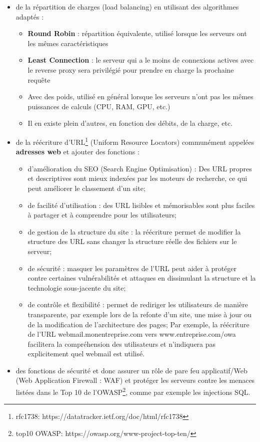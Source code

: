\begin{itemize}
    \item de la répartition de charges (load balancing) en utilisant des algorithmes adaptés :
        \begin{itemize}
            \item \textbf{Round Robin} : répartition équivalente, utilisé lorsque les serveurs ont les mêmes caractéristiques
            \item \textbf{Least Connection} : le serveur qui a le moins de connexions actives avec le reverse proxy sera privilégié pour prendre en charge la prochaine requête
            \item Avec des poids, utilisé en général lorsque les serveurs n'ont pas les mêmes puissances de calculs (CPU, RAM, GPU, etc.)
            \item Il en existe plein d'autres, en fonction des débits, de la charge, etc.
        \end{itemize}
    \item de la réécriture d'URL\footnote{rfc1738: https://datatracker.ietf.org/doc/html/rfc1738} (Uniform Resource Locators) communément appelées \textbf{adresses web} et ajouter des fonctions :
        \begin{itemize}
            \item d'amélioration du SEO (Search Engine Optimisation) : Des URL propres et descriptives sont mieux indexées par les moteurs de recherche, ce qui peut améliorer le classement d'un site;
            \item de facilité d'utilisation : des URL lisibles et mémorisables sont plus faciles à partager et à comprendre pour les utilisateurs;
            \item de gestion de la structure du site : la réécriture permet de modifier la structure des URL sans changer la structure réelle des fichiers sur le serveur;
            \item de sécurité : masquer les paramètres de l'URL peut aider à protéger contre certaines vulnérabilités et attaques en dissimulant la structure et la technologie sous-jacente du site;
            \item de contrôle et flexibilité : permet de rediriger les utilisateurs de manière transparente, par exemple lors de la refonte d'un site, une mise à jour ou de la modification de l'architecture des pages;
            Par exemple, la réécriture de l'URL webmail.monentreprise.com vers www.entreprise.com/owa facilitera la compréhension des utilisateurs et n'indiquera pas explicitement quel webmail est utilisé.
        \end{itemize}
    \item des fonctions de sécurité et donc assurer un rôle de pare feu applicatif/Web (Web Application Firewall : WAF) et protéger les serveurs contre les menaces listées dans le Top 10 de l’OWASP\footnote{top10 OWASP: https://owasp.org/www-project-top-ten/}, comme par exemple les injections SQL.
\end{itemize}

